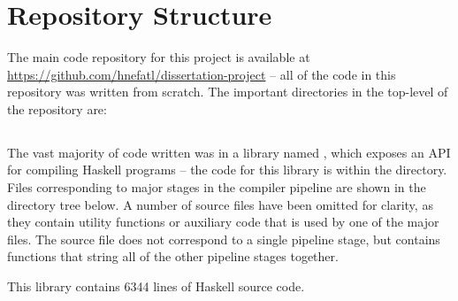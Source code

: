 \documentclass[dissertation.tex]{subfiles}
\begin{document}
\section{Repository Structure}
{

    \begin{minipage}{0.7\textwidth}
    \vspace{-0.5cm}
    The main code repository for this project is available at \url{https://github.com/hnefatl/dissertation-project} -- all of the code in this repository was written from scratch. The important directories in the top-level of the repository are:
    \end{minipage}
    \hspace{5mm}
    \begin{minipage}{0.2\textwidth}
    \vspace{0pt}
    \footnotesize
    \directorystructure{
    [./
        [app]
        [benchmarks]
        [src]
        [test]
    ]
    }
    \end{minipage}

    \subsection{}
    {
        \begin{minipage}{0.7\textwidth}
        \vspace{-5cm}
        The vast majority of code written was in a library named , which exposes an API for compiling Haskell programs -- the code for this library is within the  directory. Files corresponding to major stages in the compiler pipeline are shown in the directory tree below. A number of source files have been omitted for clarity, as they contain utility functions or auxiliary code that is used by one of the major files. The  source file does not correspond to a single pipeline stage, but contains functions that string all of the other pipeline stages together.

        This library contains 6344 lines of Haskell source code.
        \end{minipage}
        \hspace{5mm}
        \begin{minipage}{0.2\textwidth}
        \vspace{0pt}
        \footnotesize
        \end{minipage}
    }
}
\end{document}
